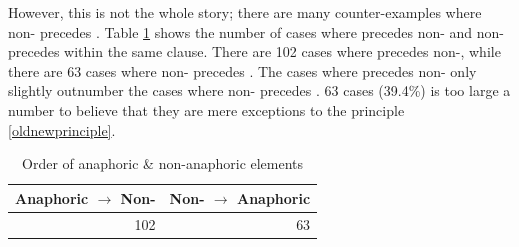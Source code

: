 
However,
this is not the whole story;
there are many counter-examples where non- precedes .%
Table \ref{GNT} shows the number of cases
where  precedes non- and non- precedes  within the same clause.
There are 102 cases where  precedes non-,
while there are 63 cases where non- precedes .
The cases where  precedes non- only slightly outnumber the cases where non- precedes .
63 cases (39.4\%) is too large a number to believe that
they are mere exceptions to the principle \ref{oldnewprinciple}.

\begin{table}
\centering
	\caption{Order of anaphoric \& non-anaphoric elements}
\begin{tabular}{rr}
	\toprule
	Anaphoric $\to$ Non-\isi{anaphoric} & Non-\isi{anaphoric} $\to$ Anaphoric \\
	\hline
	102 & 63 \\
	\bottomrule
\end{tabular}
	\label{GNT}
\end{table}

